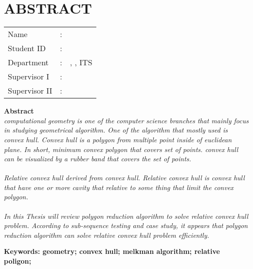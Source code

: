 \chapter {ABSTRACT}
\noindent\textbf{\MakeUppercase\juduleng}
\vspace*{1em}

\begin{tabularx}{\linewidth}{ l l p{2.2in} }
	Name 			& : & \penulis \\
	Student ID		& :	& \nrp \\
	Department 		& : & \jurusaneng, \newline \fakultaseng, ITS \\
	Supervisor I 	& : & \pembimbingsatu \\
	Supervisor II 	& : & \pembimbingdua
	\vspace*{1em} 	%
\end {tabularx}
	
\noindent\textbf{Abstract} \\
\itshape
computational geometry is one of the computer science branches that mainly focus in studying geometrical algorithm. One of the algorithm that mostly used is convex hull. Convex hull is a polygon from multiple point inside of euclidean plane. In short, minimum convex polygon that covers set of points. convex hull can be visualized by a rubber band that covers the set of points.\\\\
Relative convex hull derived from convex hull. Relative convex hull is convex hull that have one or more cavity that relative to some thing that limit the convex polygon.\\\\
In this Thesis will review polygon reduction algorithm to solve relative convex hull problem. According to sub-sequence testing and case study, it appears that polygon reduction algorithm can solve relative convex hull problem efficiently.

\vspace*{1em}
\noindent\bfseries Keywords: geometry; convex hull; melkman algorithm; relative poligon;
\normalfont
\cleardoublepage